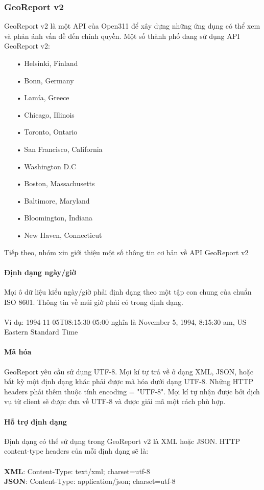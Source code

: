 \documentclass[a4paper]{article}
\begin{document}
\subsubsection{GeoReport v2}
GeoReport v2 là một API của Open311 để xây dựng những ứng dụng có thể xem và phản ánh vấn đề đến chính quyền.
Một số thành phố đang sử dụng API GeoReport v2:
\begin{itemize}
    \item[•]Helsinki, Finland
	\item[•]Bonn, Germany
	\item[•]Lamía, Greece
	\item[•]Chicago, Illinois
	\item[•]Toronto, Ontario
	\item[•]San Francisco, California
	\item[•]Washington D.C
	\item[•]Boston, Massachusetts
	\item[•]Baltimore, Maryland
	\item[•]Bloomington, Indiana
	\item[•]New Haven, Connecticut
\end{itemize}
Tiếp theo, nhóm xin giới thiệu một số thông tin cơ bản về API GeoReport v2
\paragraph*{Định dạng ngày/giờ}
Mọi ô dữ liệu kiểu ngày/giờ phải định dạng theo một tập con chung của chuẩn ISO 8601. Thông tin về múi giờ phải có trong định dạng.\\
\\
Ví dụ: 1994-11-05T08:15:30-05:00 nghĩa là  November 5, 1994, 8:15:30 am, US Eastern Standard Time

\paragraph*{Mã hóa}
GeoReport yêu cầu sử dụng UTF-8. Mọi kí tự trả về ở dạng XML, JSON, hoặc bất kỳ một định dạng khác phải được mã hóa dưới dạng UTF-8. Những HTTP headers phải thêm thuộc tính encoding = "UTF-8". Mọi kí tự nhận được bởi dịch vụ từ client sẽ được đưa về UTF-8 và được giải mã một cách phù hợp. 
\paragraph*{Hỗ trợ định dạng}
Định dạng có thể sử dụng trong GeoReport v2 là XML hoặc JSON.
HTTP content-type headers của mỗi định dạng sẽ là: \\
\\
\textbf{XML}: Content-Type: text/xml; charset=utf-8\\
\textbf{JSON}: Content-Type: application/json; charset=utf-8
\end{document}
